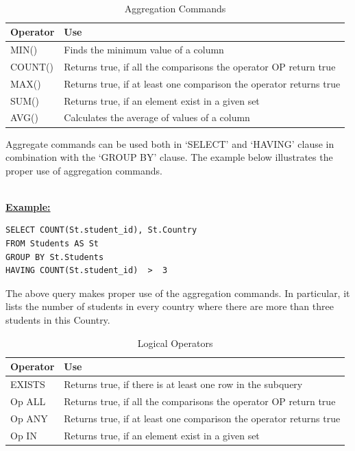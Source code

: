 \hfill\\
\begin{table}[h]
\centering
\caption{Aggregation Commands}
\label{my-label}
\begin{tabular}{|p{2cm}|p{11.5cm}| }
\hline
 \textbf{Operator}  &  \textbf{Use}                                                    \\ \hline
MIN()               & Finds the minimum value of a column                                \\ \hline
COUNT()             & Returns true, if all the comparisons the operator OP return true   \\ \hline
MAX()               & Returns true, if at least one comparison the operator returns true \\ \hline
SUM()               & Returns true, if an element exist in a given set                   \\ \hline
AVG()               & Calculates the average of values of a column                       \\ \hline
\end{tabular}
\end{table}

Aggregate commands can be used both in ‘SELECT’ and ‘HAVING’ clause in combination with the ‘GROUP BY’ clause. The example below illustrates the proper use of aggregation commands.

\hfill\\
\noindent\textbf{\underline{Example:}}
\begin{mdframed}[backgroundcolor=lightgray!20] 
\begin{lstlisting}[style=SQL]
SELECT COUNT(St.student_id), St.Country
FROM Students AS St 
GROUP BY St.Students
HAVING COUNT(St.student_id)  >  3
\end{lstlisting}
\end{mdframed}

The above query makes proper use of the aggregation commands. In particular, it lists the number of students in every country where there are more than three students in this Country.  

\begin{table}[h]
\centering
\caption{Logical  Operators}
\label{my-label}
\begin{tabular}{|p{2cm}|p{11.5cm}| }
\hline
\textbf{Operator} & \textbf{Use}                                                     \\ \hline
EXISTS            & Returns true, if there is at least one row in the subquery         \\ \hline
Op ALL            & Returns true, if all the comparisons the operator OP return true   \\ \hline
Op ANY            & Returns true, if at least one comparison the operator returns true \\ \hline
Op IN             & Returns true, if an element exist in a given set                   \\ \hline
\end{tabular}
\end{table}

